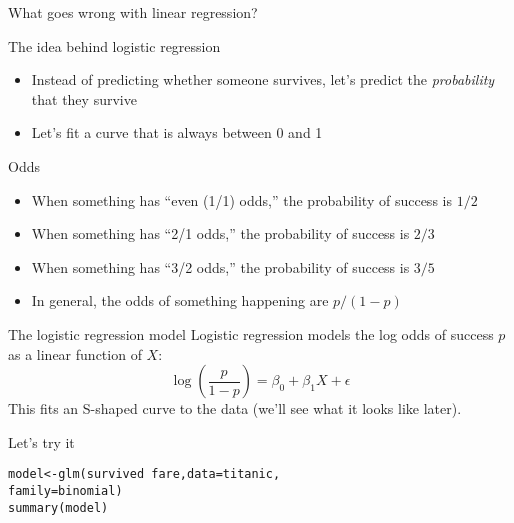 \documentclass{beamer}\usepackage[]{graphicx}\usepackage[]{color}
\makeatletter
\newcommand{\hlopt}[1]{\textcolor[rgb]{1,0.894,0.769}{#1}}%
\newcommand{\hlstd}[1]{\textcolor[rgb]{1,0.894,0.769}{#1}}%
\newcommand{\hlkwb}[1]{\textcolor[rgb]{0.804,0.776,0.451}{#1}}%
\newcommand{\hlkwc}[1]{\textcolor[rgb]{0.78,0.941,0.545}{#1}}%
\newcommand{\hlkwd}[1]{\textcolor[rgb]{1,0.78,0.769}{#1}}%
\newenvironment{kframe}{%
 \def\at@end@of@kframe{}%
 \ifinner\ifhmode%
  \def\at@end@of@kframe{\end{minipage}}%
  \begin{minipage}{\columnwidth}%
 \fi\fi%
 \def\FrameCommand##1{\hskip\@totalleftmargin \hskip-\fboxsep
 \colorbox{shadecolor}{##1}\hskip-\fboxsep
     \hskip-\linewidth \hskip-\@totalleftmargin \hskip\columnwidth}%
 \MakeFramed {\advance\hsize-\width
   \@totalleftmargin\z@ \linewidth\hsize
   \@setminipage}}%
 {\par\unskip\endMakeFramed%
 \at@end@of@kframe}
\newenvironment{knitrout}{}{} %
\makeatother
\begin{document}
\begin{darkframes}
\begin{frame}[fragile]{What goes wrong with linear regression?}
\begin{knitrout}
\end{knitrout}
\end{frame}

    \begin{frame}{The idea behind logistic regression}
      \begin{itemize}
        \item Instead of predicting whether someone survives, let's predict the \emph{probability} that they survive
        \item Let's fit a curve that is always between 0 and 1
      \end{itemize}
    \end{frame}

    \begin{frame}{Odds}
      \begin{itemize}
        \item When something has ``even (1/1) odds,'' the probability of success is $1/2$
        \item When something has ``2/1 odds,'' the probability of success is $2/3$
        \item When something has ``3/2 odds,'' the probability of success is $3/5$
        \item In general, the odds of something happening are $p/(1-p)$
      \end{itemize}
      \lc
    \end{frame}

    \begin{frame}{The logistic regression model}
      Logistic regression models the \alert{log odds} of success $p$ as a linear function of $X$:
      \[
        \log\left(\frac{p}{1-p}\right) = \beta_0 + \beta_1 X + \epsilon
      \]
      This fits an S-shaped curve to the data (we'll see what it looks like later).
    \end{frame}

\begin{frame}[fragile]{Let's try it}
\begin{knitrout}
\begin{kframe}
\begin{alltt}
\hlstd{model} \hlkwb{<-} \hlkwd{glm}\hlstd{(survived} \hlopt{~} \hlstd{fare,} \hlkwc{data}\hlstd{=titanic,}
             \hlkwc{family}\hlstd{=binomial)}
\hlkwd{summary}\hlstd{(model)}
\end{alltt}
\end{kframe}
\end{knitrout}
\end{frame}


\end{darkframes}
\end{document}

